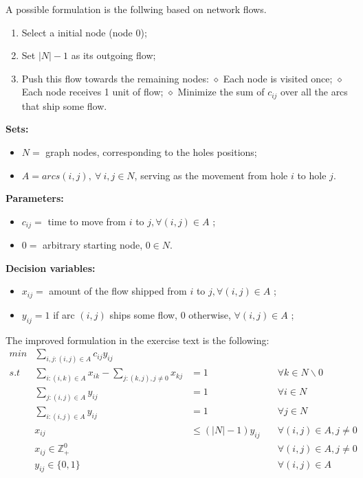 \documentclass[a4paper,12pt]{article}
\begin{document}
			A possible formulation is the follwing based on network flows.
			\begin{enumerate}
				\item Select a initial node (node 0);
				\item Set $ |N| - 1  $ as its outgoing flow;
				\item Push this flow towards the remaining nodes:
					\subitem $\diamond$ Each node is visited once;					
					\subitem $\diamond$ Each node receives 1 unit of flow;
					\subitem $\diamond$ Minimize the sum of $ c_{ij} $ over all the arcs that ship some flow.
			\end{enumerate}
			
			\hspace{-20pt}\textbf{Sets:}
			\begin{itemize}
				\item $ N = $ graph nodes, corresponding to the holes positions;
				\item $ A = arcs (i,j),\  \forall \ i,j \in N $, serving as the movement from hole $ i $ to hole $ j $.
			\end{itemize}
		
			\hspace{-20pt}\textbf{Parameters:}
			\begin{itemize}
				\item $ c_{ij} = $ time to move from $ i $ to $j,\forall (i,j) \in A $ ;
				\item $ 0 = $ arbitrary starting node, $ 0 \in N $.
			\end{itemize}
		
			\hspace{-20pt}\textbf{Decision variables:}
			\begin{itemize}
				\item $ x_{ij} = $ amount of the flow shipped from $ i $ to $j,\forall (i,j) \in A $ ;
				\item $ y_{ij} = 1 $ if arc $ (i,j) $ ships some flow, $ 0 $ otherwise, $\forall (i,j) \in A $ ;
			\end{itemize}
		
			The improved formulation in the exercise text is the following:
			\begin{align}
				min &\sum_{i,j:(i,j)\in A} c_{ij} y_{ij}\\
				s.t &\sum_{i:(i,k)\in A} x_{ik} - \sum_{j:(k,j),j\ne 0} x_{kj} 	&= 1 \qquad\qquad\qquad 	&\forall k \in N \backslash 0 \\
				&\sum_{j:(i,j)\in A} y_{ij}									   	&= 1 \qquad \qquad \qquad 	&\forall i \in N \\
				&\sum_{i:(i,j)\in A} y_{ij}									   	&= 1 \qquad \qquad \qquad 	&\forall j \in N \\
				&x_{ij}  													   	&\le (|N|-1) y_{ij} \quad 	&\forall (i,j) \in A, j\ne 0 \\
				&x_{ij}  \in \mathbb{Z}_+^0 									&   						&\forall (i,j) \in A, j\ne 0 \\
				&y_{ij}  \in \{0,1\} 											&  							&\forall (i,j) \in A 
			\end{align}
		
\end{document}
